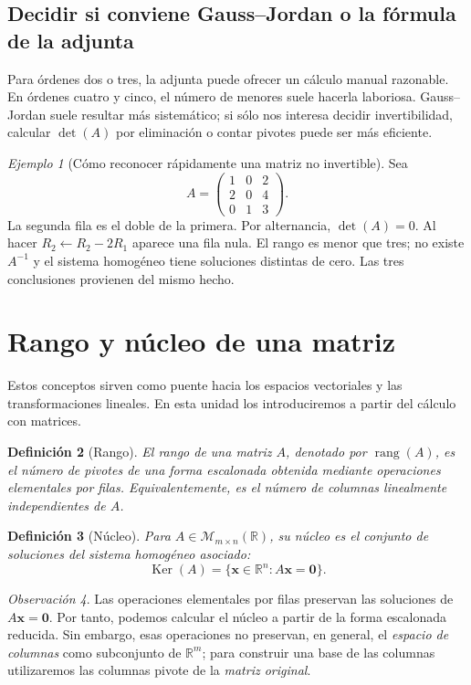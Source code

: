 \documentclass[12pt]{article}
\newtheorem{definicion}{Definición}[section]
\theoremstyle{remark}
\newtheorem{observacion}[definicion]{Observación}
\newtheorem{ejemplo}[definicion]{Ejemplo}
\newcommand{\R}{\mathbb{R}}
\newcommand{\Mat}[2]{\mathcal{M}_{#1\times #2}}
\newcommand{\rang}{\operatorname{rang}}
\newcommand{\Ker}{\operatorname{Ker}}
\newcommand{\vect}[1]{\boldsymbol{#1}}
\begin{document}
\subsection*{Decidir si conviene Gauss--Jordan o la fórmula de la adjunta}
Para órdenes dos o tres, la adjunta puede ofrecer un cálculo manual razonable. En órdenes cuatro y cinco, el número de menores suele hacerla laboriosa. Gauss--Jordan suele resultar más sistemático; si sólo nos interesa decidir invertibilidad, calcular $\det(A)$ por eliminación o contar pivotes puede ser más eficiente.
\begin{ejemplo}[Cómo reconocer rápidamente una matriz no invertible]
Sea
\[
A=\begin{pmatrix}1&0&2\\2&0&4\\0&1&3\end{pmatrix}.
\]
La segunda fila es el doble de la primera. Por alternancia, $\det(A)=0$. Al hacer $R_2\leftarrow R_2-2R_1$ aparece una fila nula. El rango es menor que tres; no existe $A^{-1}$ y el sistema homogéneo tiene soluciones distintas de cero. Las tres conclusiones provienen del mismo hecho.
\end{ejemplo}

\section{Rango y núcleo de una matriz}
Estos conceptos sirven como puente hacia los espacios vectoriales y las transformaciones lineales. En esta unidad los introduciremos a partir del cálculo con matrices.

\begin{definicion}[Rango]
El \emph{rango} de una matriz $A$, denotado por $\rang(A)$, es el número de pivotes de una forma escalonada obtenida mediante operaciones elementales por filas. Equivalentemente, es el número de columnas linealmente independientes de $A$.
\end{definicion}

\begin{definicion}[Núcleo]
Para $A\in\Mat{m}{n}(\R)$, su \emph{núcleo} es el conjunto de soluciones del sistema homogéneo asociado:
\[
\boxed{\Ker(A)=\{\vect{x}\in\R^n:A\vect{x}=\vect{0}\}.}
\]
\end{definicion}

\begin{observacion}
Las operaciones elementales por filas preservan las soluciones de $A\vect{x}=\vect0$. Por tanto, podemos calcular el núcleo a partir de la forma escalonada reducida. Sin embargo, esas operaciones no preservan, en general, el \emph{espacio de columnas} como subconjunto de $\R^m$; para construir una base de las columnas utilizaremos las columnas pivote de la \emph{matriz original}.
\end{observacion}
\end{document}
